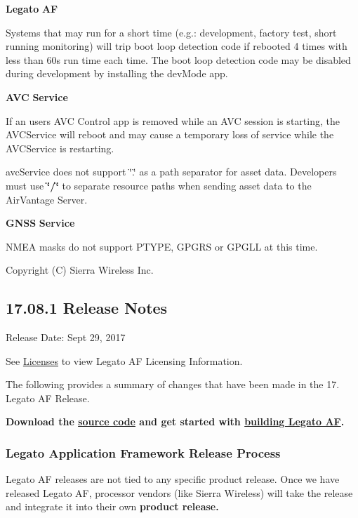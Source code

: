 {\bfseries Legato} {\bfseries AF} 
\begin{DoxyItemize}
\item Systems that may run for a short time (e.\+g.\+: development, factory test, short running monitoring) will trip boot loop detection code if rebooted 4 times with less than 60s run time each time. The boot loop detection code may be disabled during development by installing the dev\+Mode app.
\end{DoxyItemize}

{\bfseries A\+VC} {\bfseries Service} 
\begin{DoxyItemize}
\item If an users A\+VC Control app is removed while an A\+VC session is starting, the A\+V\+C\+Service will reboot and may cause a temporary loss of service while the A\+V\+C\+Service is restarting.
\item {\ttfamily avc\+Service} does not support \char`\"{}.\char`\"{} as a path separator for asset data. Developers must use {\bfseries \char`\"{}/\char`\"{}} to separate resource paths when sending asset data to the Air\+Vantage Server.
\end{DoxyItemize}

{\bfseries G\+N\+SS} {\bfseries Service} 
\begin{DoxyItemize}
\item N\+M\+EA masks do not support P\+T\+Y\+PE, G\+P\+G\+RS or G\+P\+G\+LL at this time.
\end{DoxyItemize}

Copyright (C) Sierra Wireless Inc. \hypertarget{releaseNotes17081}{}\subsection{17.08.1 Release Notes}\label{releaseNotes17081}
Release Date\+: Sept 29, 2017

See \hyperlink{aboutLicenses}{Licenses} to view Legato AF Licensing Information.

The following provides a summary of changes that have been made in the 17. Legato AF Release.

{\bfseries  Download the \hyperlink{aboutReleaseInfo}{source code} and get started with \hyperlink{basicBuild}{building Legato AF}. }\hypertarget{releaseNotes17081_rn1708_ReleaseNotes}{}\subsubsection{Legato Application Framework Release Process}\label{releaseNotes17081_rn1708_ReleaseNotes}
Legato AF releases are not tied to any specific product release. Once we have released Legato AF, processor vendors (like Sierra Wireless) will take the release and integrate it into their own {\bfseries  product release. }

